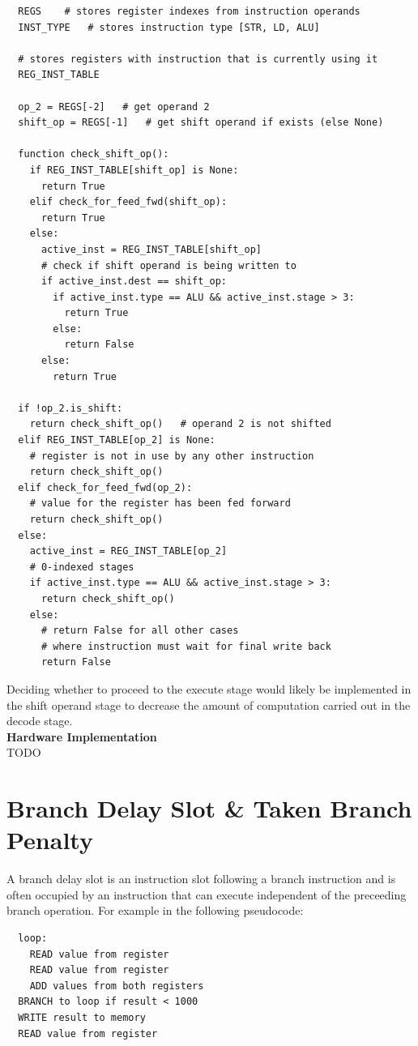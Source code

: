 \documentclass[a4paper, 12pt, oneside]{book}
\begin{document}
\begin{verbatim}
  REGS    # stores register indexes from instruction operands
  INST_TYPE   # stores instruction type [STR, LD, ALU]

  # stores registers with instruction that is currently using it
  REG_INST_TABLE

  op_2 = REGS[-2]   # get operand 2
  shift_op = REGS[-1]   # get shift operand if exists (else None)

  function check_shift_op():
    if REG_INST_TABLE[shift_op] is None:
      return True
    elif check_for_feed_fwd(shift_op):
      return True
    else:
      active_inst = REG_INST_TABLE[shift_op]
      # check if shift operand is being written to
      if active_inst.dest == shift_op:
        if active_inst.type == ALU && active_inst.stage > 3:
          return True
        else:
          return False
      else:
        return True

  if !op_2.is_shift:
    return check_shift_op()   # operand 2 is not shifted 
  elif REG_INST_TABLE[op_2] is None:
    # register is not in use by any other instruction
    return check_shift_op()     
  elif check_for_feed_fwd(op_2):
    # value for the register has been fed forward 
    return check_shift_op()   
  else:
    active_inst = REG_INST_TABLE[op_2]
    # 0-indexed stages
    if active_inst.type == ALU && active_inst.stage > 3: 
      return check_shift_op()
    else:
      # return False for all other cases
      # where instruction must wait for final write back
      return False
\end{verbatim}

Deciding whether to proceed to the execute stage would likely be implemented in the shift operand stage to decrease the amount of computation carried out in the decode stage.\\

\textbf{Hardware Implementation}\\
TODO

\section{Branch Delay Slot \& Taken Branch Penalty}

A branch delay slot is an instruction slot following a branch instruction and is often occupied by an instruction that can execute independent of the preceeding branch operation. For example in the following pseudocode:

\begin{verbatim}
  loop:
    READ value from register
    READ value from register
    ADD values from both registers
  BRANCH to loop if result < 1000
  WRITE result to memory
  READ value from register
\end{verbatim}
\end{document}
